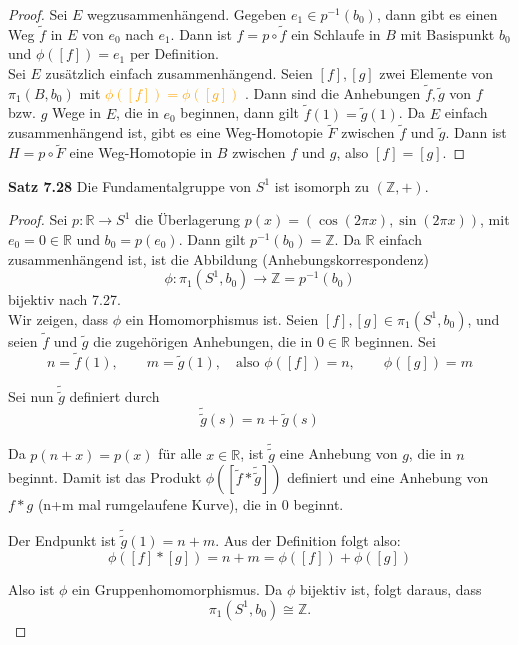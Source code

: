 \documentclass[fleqn, 12pt, letterpaper]{article}
\begin{document}
\begin{proof}
Sei \( E \) wegzusammenhängend. Gegeben \( e_1 \in p^{-1}(b_0) \), dann gibt es einen Weg \( \widetilde{f} \) in \( E \) von \( e_0 \) nach \( e_1 \). Dann ist \( f = p \circ \widetilde{f} \) ein Schlaufe in \( B \) mit Basispunkt \( b_0 \) und \( \phi([f]) = e_1 \) per Definition.\\

Sei \( E \) zusätzlich einfach zusammenhängend. Seien \( [f], [g] \) zwei Elemente von \( \pi_1(B, b_0) \) mit \textcolor{orange}{\( \phi([f]) = \phi([g]) \)} . Dann sind die Anhebungen \( \widetilde{f}, \widetilde{g} \) von \( f \) bzw. \( g \) Wege in \( E \), die in \( e_0 \) beginnen, dann gilt \(\tilde{f}(1)=\tilde{g}(1)\). Da \( E \) einfach zusammenhängend ist, gibt es eine Weg-Homotopie \( \widetilde{F} \) zwischen \( \widetilde{f} \) und \( \widetilde{g} \). Dann ist \( H = p \circ \widetilde{F} \) eine Weg-Homotopie in \( B \) zwischen \( f \) und \( g \), also \( [f] = [g] \).
\end{proof}

\textbf{Satz 7.28}
Die Fundamentalgruppe von \( S^1 \) ist isomorph zu \( (\mathbb{Z}, +) \).


\begin{proof}
Sei \( p : \mathbb{R} \to S^1 \) die Überlagerung \( p(x) = (\cos(2\pi x), \sin(2\pi x)) \), mit \( e_0 = 0 \in \mathbb{R} \) und \( b_0 = p(e_0) \). Dann gilt \( p^{-1}(b_0) = \mathbb{Z} \). Da \( \mathbb{R} \) einfach zusammenhängend ist, ist die Abbildung (Anhebungskorrespondenz)
\[
\phi : \pi_1(S^1, b_0) \longrightarrow \mathbb{Z} = p^{-1}(b_0)
\]
bijektiv nach 7.27.\\

Wir zeigen, dass \( \phi \) ein Homomorphismus ist. Seien \( [f], [g] \in \pi_1(S^1, b_0) \), und seien \( \widetilde{f} \) und \( \widetilde{g} \) die zugehörigen Anhebungen, die in \( 0 \in \mathbb{R} \) beginnen. Sei
\[
n=\tilde{f}(1), \qquad m=\tilde{g}(1),\quad \text{also } \phi([f])=n, \qquad \phi([g])=m
\]

Sei nun \( \tilde{\widetilde{g}} \) definiert durch
\[
\tilde{\widetilde{g}}(s) = n+\tilde{g}(s)
\]

Da \( p(n + x) = p(x) \) für alle \( x \in \mathbb{R} \), ist \( \tilde{\widetilde{g}} \) eine Anhebung von \( g \), die in \( n \) beginnt. Damit ist das Produkt
\(
\phi([\tilde{f} * \tilde{\widetilde{g}}]) 
\) definiert und eine Anhebung von $f*g$ (n+m mal rumgelaufene Kurve), die in 0 beginnt.



Der Endpunkt ist \( \tilde{\widetilde{g}}(1) = n+m \). Aus der Definition folgt also:
\[
\phi([f] \ast [g]) = n+m =\phi([f])+\phi([g])
\]

Also ist \( \phi \) ein Gruppenhomomorphismus. Da \( \phi \) bijektiv ist, folgt daraus, dass
\[
\pi_1(S^1, b_0) \cong \mathbb{Z}.
\]

\end{proof}
\end{document}
